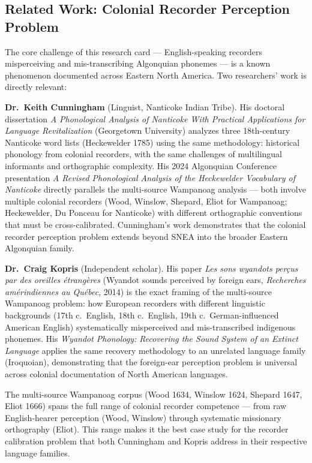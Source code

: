\subsection{Related Work: Colonial Recorder Perception Problem}

The core challenge of this research card --- English-speaking recorders
misperceiving and mis-transcribing Algonquian phonemes --- is a known
phenomenon documented across Eastern North America. Two researchers' work is
directly relevant:

\textbf{Dr.\ Keith Cunningham} (Linguist, Nanticoke Indian Tribe). His doctoral
dissertation \emph{A Phonological Analysis of Nanticoke With Practical
Applications for Language Revitalization} (Georgetown University) analyzes three
18th-century Nanticoke word lists (Heckewelder 1785) using the same methodology:
historical phonology from colonial recorders, with the same challenges of
multilingual informants and orthographic complexity. His 2024 Algonquian
Conference presentation \emph{A Revised Phonological Analysis of the Heckewelder
Vocabulary of Nanticoke} directly parallels the multi-source Wampanoag analysis
--- both involve multiple colonial recorders (Wood, Winslow, Shepard, Eliot for
Wampanoag; Heckewelder, Du Ponceau for Nanticoke) with different orthographic
conventions that must be cross-calibrated. Cunningham's work demonstrates that
the colonial recorder perception problem extends beyond SNEA into the broader
Eastern Algonquian family.

\textbf{Dr.\ Craig Kopris} (Independent scholar). His paper \emph{Les sons
wyandots perçus par des oreilles étrangères} (Wyandot sounds perceived by
foreign ears, \emph{Recherches amérindiennes au Québec}, 2014) is the exact
framing of the multi-source Wampanoag problem: how European recorders with
different linguistic backgrounds (17th c.\ English, 18th c.\ English, 19th c.\
German-influenced American English) systematically misperceived and
mis-transcribed indigenous phonemes. His \emph{Wyandot Phonology: Recovering the
Sound System of an Extinct Language} applies the same recovery methodology to an
unrelated language family (Iroquoian), demonstrating that the foreign-ear
perception problem is universal across colonial documentation of North American
languages.

The multi-source Wampanoag corpus (Wood 1634, Winslow 1624, Shepard 1647,
Eliot 1666) spans the full range of colonial recorder competence --- from raw
English-hearer perception (Wood, Winslow) through systematic missionary
orthography (Eliot). This range makes it the best case study for the recorder
calibration problem that both Cunningham and Kopris address in their respective
language families.

